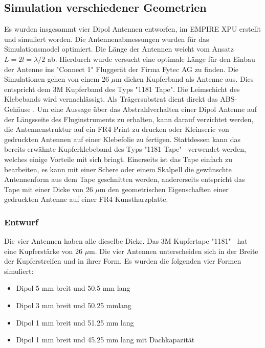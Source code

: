 \subsection{Simulation  verschiedener Geometrien}\label{sec:Sim_verschiedene_Geometrien}
Es wurden insgesammt vier Dipol Antennen entworfen, im EMPIRE XPU erstellt und simuliert worden. Die Antennenabmessungen wurden für das Simulationsmodel optimiert. Die Länge der Antennen weicht vom Ansatz $L=2l=\lambda/2$ ab. Hierdurch wurde versucht eine optimale Länge für den Einbau der Antenne ins "Connect 1" Fluggerät der Firma Fytec AG zu finden. Die Simulationen gehen von einem 26 $\mu$m dicken Kupferband als Antenne aus. Dies entspricht dem 3M Kupferband des Typs "1181 Tape". Die Leimschicht des Klebebands wird vernachlässigt. Als Trägersubstrat dient direkt das ABS-Gehäuse \cite{Kupferband}. 
Um eine Aussage über das Abstrahlverhalten einer Dipol Antenne auf der Längsseite des Fluginstruments zu erhalten, kann darauf verzichtet werden, die Antennenstruktur auf ein FR4 Print zu drucken oder Kleinserie von gedruckten Antennen auf einer Klebefolie zu fertigen. Stattdessen kann das bereits erwähnte Kupferklebeband des Typs "1181 Tape" \ verwendet werden, welches einige Vorteile mit sich bringt.
Einerseits ist das Tape einfach zu bearbeiten, es kann mit einer Schere oder einem Skalpell die gewünschte Antennenform aus dem Tape geschnitten werden, andererseits entspricht das Tape mit einer Dicke von 26 $\mu$m  den geometrischen Eigenschaften einer gedruckten Antenne auf einer FR4 Kunstharzplatte.

\newpage
\subsubsection*{Entwurf}
Die vier Antennen haben alle dieselbe Dicke. Das 3M Kupfertape "1181" \  hat eine Kupferstärke von 26 $\mu$m. Die vier Antennen unterscheiden sich in der Breite der Kupferstreifen und in ihrer Form. Es wurden die folgenden vier Formen simuliert:
\begin{itemize}
\item Dipol 5 mm breit und 50.5 mm lang
\item Dipol 3 mm breit und 50.25 mmlang
\item Dipol 1 mm breit und 51.25 mm lang
\item Dipol 1 mm breit und 45.25 mm lang mit Dachkapazität
\end{itemize}

